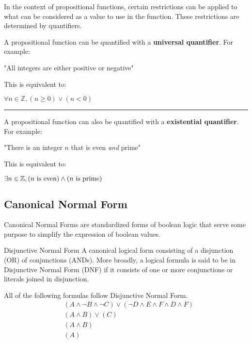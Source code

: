 \documentclass[12pt]{article}
\begin{document}
In the context of propositional functions, certain restrictions can be applied to what can
be considered as a value to use in the function. These restrictions are determined by quantifiers.

A propositional function can be quantified with a \textbf{universal quantifier}. For example:
\begin{center}
  "All integers are either positive or negative"
\end{center}
This is equivalent to:
\begin{center}
  $\forall n \in \mathbb{Z}, (n \ge 0) \lor (n < 0)$
\end{center}

\vspace{6pt}
\hrule

A propositional function can also be quantified with a \textbf{existential quantifier}. For example:
\begin{center}
  "There is an integer $n$ that is even \textit{and} prime"
\end{center}
This is equivalent to:
\begin{center}
  $\exists n \in \mathbb{Z}, (n \textup{ is even}) \land (n \textup{ is prime})$
\end{center}

\subsection{Canonical Normal Form}
\label{ssec:canonicalNormalForm}

Canonical Normal Forms are standardized forms of boolean logic that serve some purpose to
simplify the expression of boolean values.

\begin{definition}{Disjunctive Normal Form}
  A canonical logical form consisting of a disjunction (OR) of conjunctions (ANDs). More broadly,
  a logical formula is said to be in Disjunctive Normal Form (DNF) if it consists of one or
  more conjunctions or literals joined in disjunction.
\end{definition}

All of the following formulas follow Disjunctive Normal Form.
\begin{align*}
  &(A \land \neg B \land \neg C) \lor (\neg D \land E \land F \land D \land F) \\
  &(A \land B) \lor (C) \\
  &(A \land B) \\
  &(A)
\end{align*}
\end{document}
